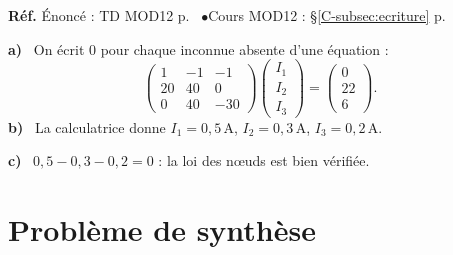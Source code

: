 \documentclass[a4paper,11pt]{article}
\newcommand{\M}[1]{\begin{pmatrix}#1\end{pmatrix}}
\newcommand{\cours}[1]{§\ref{C-#1} p.~\pageref{C-#1}}
\newcommand{\source}[2]{{\footnotesize\color{uimmgray}\textbf{Réf.} \enspace Énoncé : TD MOD12 p.~\pageref{T-#1} \enspace$\bullet$\enspace Cours MOD12 : #2}\par\smallskip}
\newcommand{\q}[1]{\textbf{\color{uimmblue}#1}\ }
\begin{document}
\begin{correction}
\source{exo:16}{\cours{subsec:ecriture}}
\q{a)} On écrit $0$ pour chaque inconnue absente d'une équation :
\[
\M{1 & -1 & -1\\ 20 & 40 & 0\\ 0 & 40 & -30}\M{I_1\\I_2\\I_3} = \M{0\\22\\6}.
\]
\q{b)} La calculatrice donne $I_1 = 0{,}5$\,A, $I_2 = 0{,}3$\,A, $I_3 = 0{,}2$\,A.

\q{c)} $0{,}5 - 0{,}3 - 0{,}2 = 0$ : la loi des nœuds est bien vérifiée.
\end{correction}

\needspace{8cm}
\section{Problème de synthèse}
\end{document}
